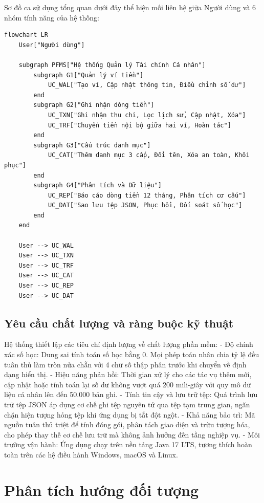 \documentclass[a4paper,12pt]{report}
\begin{document}
Sơ đồ ca sử dụng tổng quan dưới đây thể hiện mối liên hệ giữa Người dùng
và 6 nhóm tính năng của hệ thống:

\begin{lstlisting}
flowchart LR
    User["Người dùng"]

    subgraph PFMS["Hệ thống Quản lý Tài chính Cá nhân"]
        subgraph G1["Quản lý ví tiền"]
            UC_WAL["Tạo ví, Cập nhật thông tin, Điều chỉnh số dư"]
        end
        subgraph G2["Ghi nhận dòng tiền"]
            UC_TXN["Ghi nhận thu chi, Lọc lịch sử, Cập nhật, Xóa"]
            UC_TRF["Chuyển tiền nội bộ giữa hai ví, Hoàn tác"]
        end
        subgraph G3["Cấu trúc danh mục"]
            UC_CAT["Thêm danh mục 3 cấp, Đổi tên, Xóa an toàn, Khôi phục"]
        end
        subgraph G4["Phân tích và Dữ liệu"]
            UC_REP["Báo cáo dòng tiền 12 tháng, Phân tích cơ cấu"]
            UC_DAT["Sao lưu tệp JSON, Phục hồi, Đối soát số học"]
        end
    end

    User --> UC_WAL
    User --> UC_TXN
    User --> UC_TRF
    User --> UC_CAT
    User --> UC_REP
    User --> UC_DAT
\end{lstlisting}

\section{Yêu cầu chất lượng và ràng buộc kỹ
thuật}\label{yuxeau-cux1ea7u-chux1ea5t-lux1b0ux1ee3ng-vuxe0-ruxe0ng-buux1ed9c-kux1ef9-thuux1eadt}

Hệ thống thiết lập các tiêu chí định lượng về chất lượng phần mềm: - Độ
chính xác số học: Dung sai tính toán số học bằng 0. Mọi phép toán nhân
chia tỷ lệ đều tuân thủ làm tròn nửa chẵn với 4 chữ số thập phân trước
khi chuyển về định dạng hiển thị. - Hiệu năng phản hồi: Thời gian xử lý
cho các tác vụ thêm mới, cập nhật hoặc tính toán lại số dư không vượt
quá 200 mili-giây với quy mô dữ liệu cá nhân lên đến 50.000 bản ghi. -
Tính tin cậy và lưu trữ tệp: Quá trình lưu trữ tệp JSON áp dụng cơ chế
ghi tệp nguyên tử qua tệp tạm trung gian, ngăn chặn hiện tượng hỏng tệp
khi ứng dụng bị tắt đột ngột. - Khả năng bảo trì: Mã nguồn tuân thủ
triệt để tính đóng gói, phân tách giao diện và trừu tượng hóa, cho phép
thay thế cơ chế lưu trữ mà không ảnh hưởng đến tầng nghiệp vụ. - Môi
trường vận hành: Ứng dụng chạy trên nền tảng Java 17 LTS, tương thích
hoàn toàn trên các hệ điều hành Windows, macOS và Linux.

\chapter{Phân tích hướng đối
tượng}\label{phuxe2n-tuxedch-hux1b0ux1edbng-ux111ux1ed1i-tux1b0ux1ee3ng}
\end{document}
